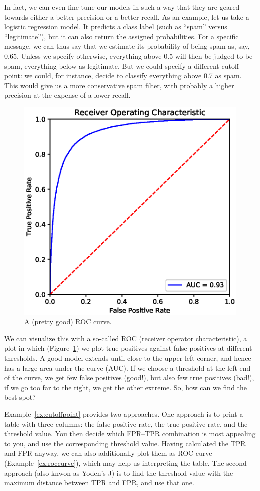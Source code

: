 In fact, we can even fine-tune our models in such a way that they are
geared towards either a better precision or a better recall.
As an example, let us take a logistic regression model. It predicts a
class label (such as ``spam'' versus ``legitimate''), but it can also
return the assigned probabilities. For a specific message, we can thus
say that we estimate its probability of being spam as, say, 0.65.
Unless we specify otherwise, everything above 0.5 will then be judged
to be spam, everything below as legitimate. But we could specify a
different cutoff point: we could, for instance, decide to classify
 everything above 0.7 as spam. This would give us a more
conservative spam filter, with probably a higher precision at the
expense of a lower recall.

\begin{figure}
\centering
\includegraphics[width=0.4\linewidth]{figures/ch09_roccurve.eps}
\caption{A (pretty good) ROC curve.}
\label{fig:roccurve}
\end{figure}

We can visualize this with a so-called ROC (receiver operator
characteristic), a plot in which (Figure~\ref{fig:roccurve}) we plot
true positives against false positives at different thresholds.  A
good model extends until close to the upper left corner, and hence has
a large area under the curve (AUC).  If we choose a threshold at the
left end of the curve, we get few false positives (good!), but also
few true positives (bad!), if we go too far to the right, we get
the other extreme. So, how can we find the best spot?

Example~\ref{ex:cutoffpoint} provides two approaches. One approach is to print a table with three columns: the false
positive rate, the true positive rate, and the threshold value. You
then decide which FPR--TPR combination is most appealing to you, and
use the corresponding threshold value. Having calculated the TPR and FPR anyway, we can
also additionally plot them as ROC curve (Example~\ref{ex:roccurve}), which may help
us interpreting the table.
The second approach (also knwon as Yoden's J) is to find the threshold
value with the maximum distance between TPR and FPR, and use that one.

